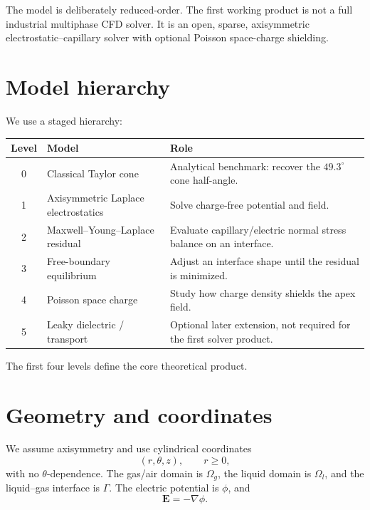 \documentclass[11pt]{article}
\newcommand{\vE}{\mathbf{E}}
\newcommand{\grad}{\nabla}
\begin{document}
The model is deliberately reduced-order.  The first working product is not a full industrial multiphase CFD solver.  It is an open, sparse, axisymmetric electrostatic--capillary solver with optional Poisson space-charge shielding.

\section{Model hierarchy}

We use a staged hierarchy:

\begin{center}
\begin{tabular}{@{}clp{}@{}}
\toprule
Level & Model & Role \\
\midrule
0 & Classical Taylor cone & Analytical benchmark: recover the \(49.3^\circ\) cone half-angle. \\
1 & Axisymmetric Laplace electrostatics & Solve charge-free potential and field. \\
2 & Maxwell--Young--Laplace residual & Evaluate capillary/electric normal stress balance on an interface. \\
3 & Free-boundary equilibrium & Adjust an interface shape until the residual is minimized. \\
4 & Poisson space charge & Study how charge density shields the apex field. \\
5 & Leaky dielectric / transport & Optional later extension, not required for the first solver product. \\
\bottomrule
\end{tabular}
\end{center}

The first four levels define the core theoretical product.

\section{Geometry and coordinates}

We assume axisymmetry and use cylindrical coordinates
\begin{equation}
    (r,\theta,z), \qquad r\ge 0,
\end{equation}
with no \(\theta\)-dependence.  The gas/air domain is \(\Omega_g\), the liquid domain is \(\Omega_l\), and the liquid--gas interface is \(\Gamma\).  The electric potential is \(\phi\), and
\begin{equation}
    \vE=-\grad\phi.
\end{equation}
\end{document}
